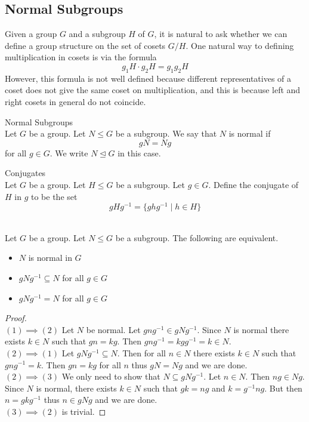\documentclass[a4paper]{article}
\begin{document}
\subsection{Normal Subgroups}
Given a group $G$ and a subgroup $H$ of $G$, it is natural to ask whether we can define a group structure on the set of cosets $G/H$. One natural way to defining multiplication in cosets is via the formula $$g_1H\cdot g_2H=g_1g_2H$$ However, this formula is not well defined because different representatives of a coset does not give the same coset on multiplication, and this is because left and right cosets in general do not coincide. 

\begin{defn}{Normal Subgroups}{}\\
Let $G$ be a group. Let $N\leq G$ be a subgroup. We say that $N$ is normal if $$gN=Ng$$ for all $g\in G$. We write $N\trianglelefteq G$ in this case. 
\end{defn}

\begin{defn}{Conjugates}{}\\
Let $G$ be a group. Let $H\leq G$ be a subgroup. Let $g\in G$. Define the conjugate of $H$ in $g$ to be the set $$gHg^{-1}=\{ghg^{-1}\;|\;h\in H\}$$
\end{defn}

\begin{prp}{}{}\\
Let $G$ be a group. Let $N\leq G$ be a subgroup. The following are equivalent. 
\begin{itemize}
\item $N$ is normal in $G$
\item $gNg^{-1}\subseteq N$ for all $g\in G$
\item $gNg^{-1}=N$ for all $g\in G$
\end{itemize}
\begin{proof}\\
$(1)\implies(2)$ Let $N$ be normal. Let $gng^{-1}\in gNg^{-1}$. Since $N$ is normal there exists $k\in N$ such that $gn=kg$. Then $gng^{-1}=kgg^{-1}=k\in N$. \\

$(2)\implies(1)$ Let $gNg^{-1}\subseteq N$. Then for all $n\in N$ there exists $k\in N$ such that $gng^{-1}=k$. Then $gn=kg$ for all $n$ thus $gN=Ng$ and we are done. \\

$(2)\implies(3)$ We only need to show that $N\subseteq gNg^{-1}$. Let $n\in N$. Then $ng\in Ng$. Since $N$ is normal, there exists $k\in N$ such that $gk=ng$ and $k=g^{-1}ng$. But then $n=gkg^{-1}$ thus $n\in gNg$ and we are done. \\

$(3)\implies(2)$ is trivial. 
\end{proof}
\end{prp}
\end{document}
